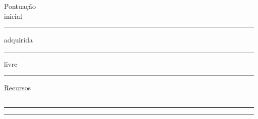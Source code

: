 \documentclass[a4paper,12pt]{article}
\begin{document}
	\begin{minipage}{\linewidth}
		\begin{minipage}{.7\linewidth}
			\Capricorn \hspace{3pt} Pontuação\\
			inicial \rule{.1\linewidth}{.5pt} 
			adquirida \rule{.3\linewidth}{.5pt} 
			livre \rule{.2\linewidth}{.5pt}
		\end{minipage}
		\begin{minipage}{.2\linewidth}
			{\centering Recursos\\}
			\rule{\linewidth}{.5pt}
			\rule{\linewidth}{.5pt}
			\rule{\linewidth}{.5pt}
		\end{minipage}
	\end{minipage}
	
\end{document}
